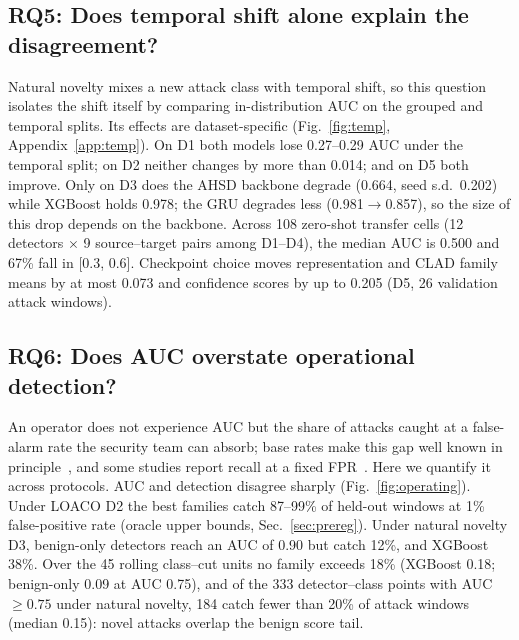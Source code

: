 \documentclass[conference]{IEEEtran}
\begin{document}
\subsection{RQ5: Does temporal shift alone explain the disagreement?}
\label{sec:c5}
Natural novelty mixes a new attack class with temporal shift, so this question isolates the shift itself by comparing in-distribution AUC on the grouped and temporal splits. Its effects are dataset-specific (Fig.~\ref{fig:temp}, Appendix~\ref{app:temp}). On D1 both models lose 0.27--0.29 AUC under the temporal split; on D2 neither changes by more than 0.014; and on D5 both improve. Only on D3 does the AHSD backbone degrade (0.664, seed s.d.\ 0.202) while XGBoost holds 0.978; the GRU degrades less (0.981$\rightarrow$0.857), so the size of this drop depends on the backbone. Across 108 zero-shot transfer cells (12 detectors $\times$ 9 source--target pairs among D1--D4), the median AUC is 0.500 and 67\% fall in [0.3, 0.6]. Checkpoint choice moves representation and CLAD family means by at most 0.073 and confidence scores by up to 0.205 (D5, 26 validation attack windows).



\subsection{RQ6: Does AUC overstate operational detection?}
\label{sec:c6}
An operator does not experience AUC but the share of attacks caught at a false-alarm rate the security team can absorb; base rates make this gap well known in principle~\cite{arp2022,apruzzese2023sok}, and some studies report recall at a fixed FPR~\cite{nayak2026,mesca2026,aslam2026bimodal}. Here we quantify it across protocols. AUC and detection disagree sharply (Fig.~\ref{fig:operating}). Under LOACO D2 the best families catch 87--99\% of held-out windows at 1\% false-positive rate (oracle upper bounds, Sec.~\ref{sec:prereg}). Under natural novelty D3, benign-only detectors reach an AUC of 0.90 but catch 12\%, and XGBoost 38\%. Over the 45 rolling class--cut units no family exceeds 18\% (XGBoost 0.18; benign-only 0.09 at AUC 0.75), and of the 333 detector--class points with AUC $\geq0.75$ under natural novelty, 184 catch fewer than 20\% of attack windows (median 0.15): novel attacks overlap the benign score tail.
\end{document}
